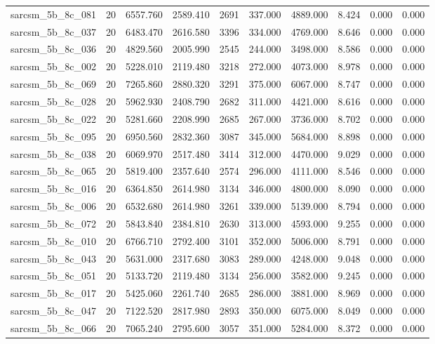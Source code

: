\begin{tabular}{lrrrrrrrrr}
sarcsm\_5b\_8c\_081 & 20 & 6557.760 & 2589.410 & 2691 & 337.000 & 4889.000 & 8.424 & 0.000 & 0.000 \\
sarcsm\_5b\_8c\_037 & 20 & 6483.470 & 2616.580 & 3396 & 334.000 & 4769.000 & 8.646 & 0.000 & 0.000 \\
sarcsm\_5b\_8c\_036 & 20 & 4829.560 & 2005.990 & 2545 & 244.000 & 3498.000 & 8.586 & 0.000 & 0.000 \\
sarcsm\_5b\_8c\_002 & 20 & 5228.010 & 2119.480 & 3218 & 272.000 & 4073.000 & 8.978 & 0.000 & 0.000 \\
sarcsm\_5b\_8c\_069 & 20 & 7265.860 & 2880.320 & 3291 & 375.000 & 6067.000 & 8.747 & 0.000 & 0.000 \\
sarcsm\_5b\_8c\_028 & 20 & 5962.930 & 2408.790 & 2682 & 311.000 & 4421.000 & 8.616 & 0.000 & 0.000 \\
sarcsm\_5b\_8c\_022 & 20 & 5281.660 & 2208.990 & 2685 & 267.000 & 3736.000 & 8.702 & 0.000 & 0.000 \\
sarcsm\_5b\_8c\_095 & 20 & 6950.560 & 2832.360 & 3087 & 345.000 & 5684.000 & 8.898 & 0.000 & 0.000 \\
sarcsm\_5b\_8c\_038 & 20 & 6069.970 & 2517.480 & 3414 & 312.000 & 4470.000 & 9.029 & 0.000 & 0.000 \\
sarcsm\_5b\_8c\_065 & 20 & 5819.400 & 2357.640 & 2574 & 296.000 & 4111.000 & 8.546 & 0.000 & 0.000 \\
sarcsm\_5b\_8c\_016 & 20 & 6364.850 & 2614.980 & 3134 & 346.000 & 4800.000 & 8.090 & 0.000 & 0.000 \\
sarcsm\_5b\_8c\_006 & 20 & 6532.680 & 2614.980 & 3261 & 339.000 & 5139.000 & 8.794 & 0.000 & 0.000 \\
sarcsm\_5b\_8c\_072 & 20 & 5843.840 & 2384.810 & 2630 & 313.000 & 4593.000 & 9.255 & 0.000 & 0.000 \\
sarcsm\_5b\_8c\_010 & 20 & 6766.710 & 2792.400 & 3101 & 352.000 & 5006.000 & 8.791 & 0.000 & 0.000 \\
sarcsm\_5b\_8c\_043 & 20 & 5631.000 & 2317.680 & 3083 & 289.000 & 4248.000 & 9.048 & 0.000 & 0.000 \\
sarcsm\_5b\_8c\_051 & 20 & 5133.720 & 2119.480 & 3134 & 256.000 & 3582.000 & 9.245 & 0.000 & 0.000 \\
sarcsm\_5b\_8c\_017 & 20 & 5425.060 & 2261.740 & 2685 & 286.000 & 3881.000 & 8.969 & 0.000 & 0.000 \\
sarcsm\_5b\_8c\_047 & 20 & 7122.520 & 2817.980 & 2893 & 350.000 & 6075.000 & 8.049 & 0.000 & 0.000 \\
sarcsm\_5b\_8c\_066 & 20 & 7065.240 & 2795.600 & 3057 & 351.000 & 5284.000 & 8.372 & 0.000 & 0.000 \\

\end{tabular}
